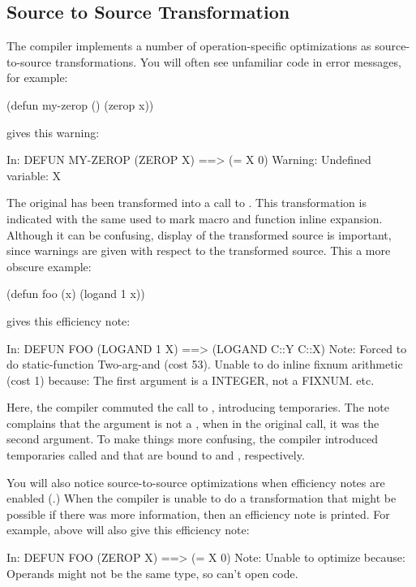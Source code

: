 \subsection{Source to Source Transformation}

The compiler implements a number of operation-specific optimizations as
source-to-source transformations.  You will often see unfamiliar code in error
messages, for example:
\begin{lisp}
(defun my-zerop () (zerop x))
\end{lisp}
gives this warning:
\begin{example}
In: DEFUN MY-ZEROP
  (ZEROP X)
==>
  (= X 0)
Warning: Undefined variable: X
\end{example}
The original  has been transformed into a call to \code{=}.  This
transformation is indicated with the same \code{==>} used to mark macro and
function inline expansion.  Although it can be confusing, display of the
transformed source is important, since warnings are given with respect to the
transformed source.  This a more obscure example:
\begin{lisp}
(defun foo (x) (logand 1 x))
\end{lisp}
gives this efficiency note:
\begin{example}
In: DEFUN FOO
  (LOGAND 1 X)
==>
  (LOGAND C::Y C::X)
Note: Forced to do static-function Two-arg-and (cost 53).
      Unable to do inline fixnum arithmetic (cost 1) because:
      The first argument is a INTEGER, not a FIXNUM.
      etc.
\end{example}
Here, the compiler commuted the call to , introducing temporaries.
The note complains that the  argument is not a , when in the
original call, it was the second argument.  To make things more confusing, the
compiler introduced temporaries called  and  that are bound to
 and , respectively.

You will also notice source-to-source optimizations when efficiency notes are
enabled (.)  When the compiler is unable to
do a transformation that might be possible if there was more information, then
an efficiency note is printed.  For example,  above will also give
this efficiency note:
\begin{example}
In: DEFUN FOO
  (ZEROP X)
==>
  (= X 0)
Note: Unable to optimize because:
      Operands might not be the same type, so can't open code.
\end{example}

